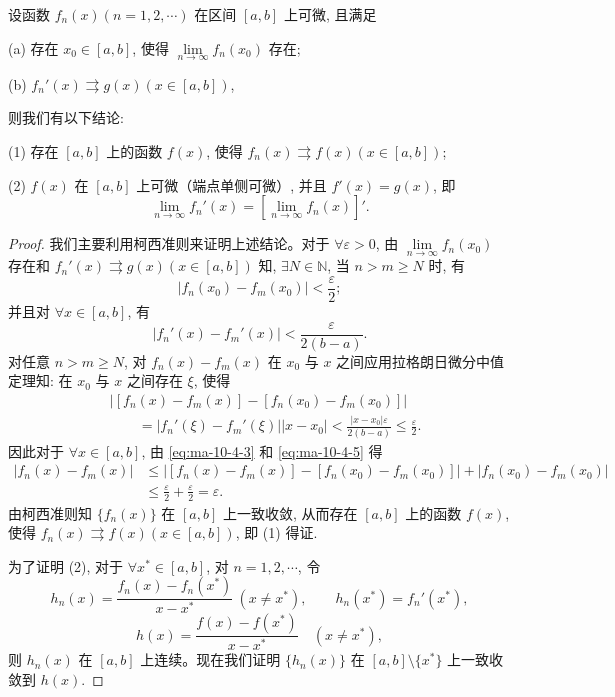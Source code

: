 \begin{theorem}\label{theorem:ma-10-4-4}
设函数 $f_n(x)(n=1,2,\cdots)$ 在区间 $[a,b]$ 上可微, 且满足

(a) 存在 $x_0\in[a,b]$, 使得 $\lim\limits_{n\to\infty}f_n(x_0)$ 存在;

(b) $f_n'(x)\rightrightarrows g(x)(x\in[a,b])$,

则我们有以下结论:

(1) 存在 $[a,b]$ 上的函数 $f(x)$, 使得 $f_n(x)\rightrightarrows f(x)(x\in[a,b])$;

(2) $f(x)$ 在 $[a,b]$ 上可微（端点单侧可微）, 并且 $f'(x)=g(x)$, 即
\[
  \lim_{n\to\infty}f_n'(x)=\left[\lim_{n\to\infty}f_n(x)\right]'.
\]
\end{theorem}


\begin{proof}
我们主要利用柯西准则来证明上述结论。对于 $\forall\varepsilon>0$, 由 $\lim\limits_{n\to\infty}f_n(x_0)$ 存在和 $f_n'(x)\rightrightarrows g(x)(x\in[a,b])$ 知, $\exists N\in\mathbb N$, 当 $n>m\geq N$ 时, 有
\begin{equation}
  |f_n(x_0)-f_m(x_0)|<\frac\varepsilon2;
  \label{eq:ma-10-4-3}
\end{equation}
并且对 $\forall x\in[a,b]$, 有
\begin{equation}
  |f_n'(x)-f_m'(x)|<\frac{\varepsilon}{2(b-a)}.
  \label{eq:ma-10-4-4}
\end{equation}
对任意 $n>m\geq N$, 对 $f_n(x)-f_m(x)$ 在 $x_0$ 与 $x$ 之间应用拉格朗日微分中值定理知: 在 $x_0$ 与 $x$ 之间存在 $\xi$, 使得
\begin{equation}
\begin{aligned}
  &\left|[f_n(x)-f_m(x)]-[f_n(x_0)-f_m(x_0)]\right|\\
  &\qquad =|f_n'(\xi)-f_m'(\xi)||x-x_0|
   <\frac{|x-x_0|\varepsilon}{2(b-a)}\leq\frac\varepsilon2.
\end{aligned}
  \label{eq:ma-10-4-5}
\end{equation}
因此对于 $\forall x\in[a,b]$, 由 \eqref{eq:ma-10-4-3} 和 \eqref{eq:ma-10-4-5} 得
\[
\begin{aligned}
  |f_n(x)-f_m(x)|
  &\leq \left|[f_n(x)-f_m(x)]-[f_n(x_0)-f_m(x_0)]\right|
      +|f_n(x_0)-f_m(x_0)|\\
  &\leq\frac\varepsilon2+\frac\varepsilon2=\varepsilon.
\end{aligned}
\]
由柯西准则知 $\{f_n(x)\}$ 在 $[a,b]$ 上一致收敛, 从而存在 $[a,b]$ 上的函数 $f(x)$, 使得 $f_n(x)\rightrightarrows f(x)(x\in[a,b])$, 即 (1) 得证.

为了证明 (2), 对于 $\forall x^*\in[a,b]$, 对 $n=1,2,\cdots$, 令
\[
  h_n(x)=\frac{f_n(x)-f_n(x^*)}{x-x^*}\ (x\ne x^*),\qquad h_n(x^*)=f_n'(x^*),
\]
\[
  h(x)=\frac{f(x)-f(x^*)}{x-x^*}\quad (x\ne x^*),
\]
则 $h_n(x)$ 在 $[a,b]$ 上连续。现在我们证明 $\{h_n(x)\}$ 在 $[a,b]\setminus\{x^*\}$ 上一致收敛到 $h(x)$.


\end{proof}
